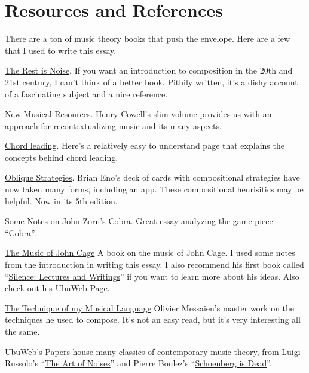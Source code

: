 \documentclass[
]{book}
\begin{document}
\hypertarget{resources-and-references}{%
\section{Resources and References}\label{resources-and-references}}

There are a ton of music theory books that push the envelope. Here are a few that I used to write this essay.

\href{http://www.therestisnoise.com}{The Rest is Noise}. If you want an introduction to composition in the 20th and 21st century, I can't think of a better book. Pithily written, it's a dishy account of a fascinating subject and a nice reference.

\href{http://zztt.org/lmc2_files/Cowell_New_Musical_Resources.pdf}{New Musical Resources}. Henry Cowell's slim volume provides us with an approach for recontextualizing music and its many aspects.

\href{http://www.musicarrangerspage.com/4606/chords-under-a-melody-chord-leading/}{Chord leading}. Here's a relatively easy to understand page that explains the concepts behind chord leading.

\href{http://www.rtqe.net/ObliqueStrategies/}{Oblique Strategies}. Brian Eno's deck of cards with compositional strategies have now taken many forms, including an app. These compositional heurisitics may be helpful. Now in its 5th edition.

\href{https://www2.ak.tu-berlin.de/~gastprof/collins/experimental-music/Zorn/americanmusic.28.1.0044.pdf}{Some Notes on John Zorn's Cobra}. Great essay analyzing the game piece ``Cobra''.

\href{http://rosewhitemusic.com/piano/writings/introduction-music-john-cage/}{The Music of John Cage} A book on the music of John Cage. I used some notes from the introduction in writing this essay. I also recommend his first book called ``\href{https://en.wikipedia.org/wiki/Silence:_Lectures_and_Writings}{Silence: Lectures and Writings}'' if you want to learn more about his ideas. Also check out his \href{http://www.ubu.com/sound/cage.html}{UbuWeb Page}.

\href{http://monoskop.org/images/5/50/Messiaen_Olivier_The_Technique_of_My_Musical_Language.pdf}{The Technique of my Musical Language} Olivier Messaien's master work on the techniques he used to compose. It's not an easy read, but it's very interesting all the same.

\href{http://www.ubu.com/papers/}{UbuWeb's Papers} house many classics of contemporary music theory, from Luigi Russolo's ``\href{http://www.ubu.com/papers/russolo.html}{The Art of Noises}'' and Pierre Boulez's ``\href{http://www.ubu.com/papers/Boulez-Schoenberg+Is+Dead.pdf}{Schoenberg is Dead}''.
\end{document}

